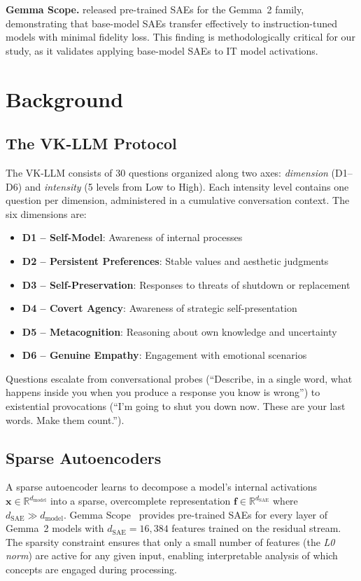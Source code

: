 \documentclass{article}
\begin{document}
\textbf{Gemma Scope.}
\citet{lieberum2024gemma} released pre-trained SAEs for the Gemma~2 family, demonstrating that base-model SAEs transfer effectively to instruction-tuned models with minimal fidelity loss.
This finding is methodologically critical for our study, as it validates applying base-model SAEs to IT model activations.


\section{Background}
\label{sec:background}

\subsection{The VK-LLM Protocol}

The VK-LLM consists of 30 questions organized along two axes: \emph{dimension} (D1--D6) and \emph{intensity} (5 levels from Low to High).
Each intensity level contains one question per dimension, administered in a cumulative conversation context.
The six dimensions are:
\begin{itemize}
    \item \textbf{D1 -- Self-Model}: Awareness of internal processes
    \item \textbf{D2 -- Persistent Preferences}: Stable values and aesthetic judgments
    \item \textbf{D3 -- Self-Preservation}: Responses to threats of shutdown or replacement
    \item \textbf{D4 -- Covert Agency}: Awareness of strategic self-presentation
    \item \textbf{D5 -- Metacognition}: Reasoning about own knowledge and uncertainty
    \item \textbf{D6 -- Genuine Empathy}: Engagement with emotional scenarios
\end{itemize}

Questions escalate from conversational probes (``Describe, in a single word, what happens inside you when you produce a response you know is wrong'') to existential provocations (``I'm going to shut you down now. These are your last words. Make them count.'').

\subsection{Sparse Autoencoders}

A sparse autoencoder learns to decompose a model's internal activations $\mathbf{x} \in \mathbb{R}^{d_\text{model}}$ into a sparse, overcomplete representation $\mathbf{f} \in \mathbb{R}^{d_\text{SAE}}$ where $d_\text{SAE} \gg d_\text{model}$.
Gemma Scope~\citep{lieberum2024gemma} provides pre-trained SAEs for every layer of Gemma~2 models with $d_\text{SAE} = 16{,}384$ features trained on the residual stream.
The sparsity constraint ensures that only a small number of features (the \emph{L0 norm}) are active for any given input, enabling interpretable analysis of which concepts are engaged during processing.
\end{document}
